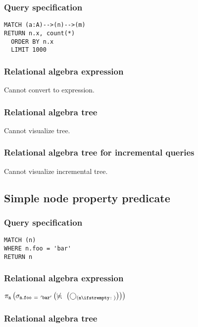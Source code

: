 \subsubsection*{Query specification}

\begin{lstlisting}
MATCH (a:A)-->(n)-->(m)
RETURN n.x, count(*)
  ORDER BY n.x
  LIMIT 1000
\end{lstlisting}

\subsubsection*{Relational algebra expression}

Cannot convert to expression.

\subsubsection*{Relational algebra tree}

Cannot visualize tree.

\subsubsection*{Relational algebra tree for incremental queries}

Cannot visualize incremental tree.

\subsection{Simple node property predicate}

\subsubsection*{Query specification}

\begin{lstlisting}
MATCH (n)
WHERE n.foo = 'bar'
RETURN n
\end{lstlisting}

\subsubsection*{Relational algebra expression}

$\projection{\var{n}} \left(\selection{\mathtt{n.foo~=~'bar'}} \left(\alldifferent{} \left(\getvertices{n}{}\right)\right)\right)$

\subsubsection*{Relational algebra tree}

